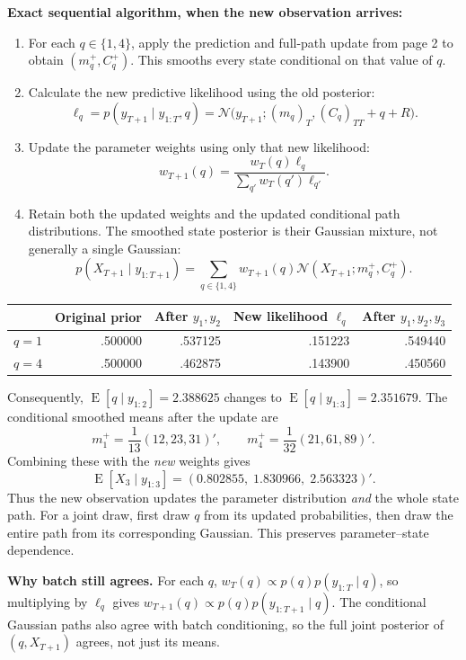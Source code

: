 \documentclass[10pt,a4paper]{article}
\newcommand{\Normal}{\mathcal N}
\newcommand{\E}{\operatorname E}
\begin{document}
\textbf{Exact sequential algorithm, when the new observation arrives:}
\begin{enumerate}
\item For each $q\in\{1,4\}$, apply the prediction and full-path update from page 2 to
obtain $(m_q^+,C_q^+)$. This smooths every state conditional on that value of $q$.
\item Calculate the new predictive likelihood using the old posterior:
\[
\ell_q=p(y_{T+1}\mid y_{1:T},q)
=\Normal\bigl(y_{T+1};(m_q)_T,(C_q)_{TT}+q+R\bigr).
\]
\item Update the parameter weights using only that new likelihood:
\[
\boxed{w_{T+1}(q)=\frac{w_T(q)\ell_q}{\sum_{q'}w_T(q')\ell_{q'}}.}
\]
\item Retain both the updated weights and the updated conditional path distributions.
The smoothed state posterior is their Gaussian mixture, not generally a single Gaussian:
\[
p(X_{T+1}\mid y_{1:T+1})
=\sum_{q\in\{1,4\}}w_{T+1}(q)\Normal(X_{T+1};m_q^+,C_q^+).
\]
\end{enumerate}

\begin{center}\small
\begin{tabular}{lrrrr}\toprule
& Original prior & After $y_1,y_2$ & New likelihood $\ell_q$ & After $y_1,y_2,y_3$\\\midrule
$q=1$ & .500000 & .537125 & .151223 & .549440\\
$q=4$ & .500000 & .462875 & .143900 & .450560\\\bottomrule
\end{tabular}
\end{center}
Consequently, $\E[q\mid y_{1:2}]=2.388625$ changes to
$\E[q\mid y_{1:3}]=2.351679$. The conditional smoothed means after the update are
\[
m_1^+=\frac1{13}(12,23,31)',\qquad
m_4^+=\frac1{32}(21,61,89)'.
\]
Combining these with the \emph{new} weights gives
\[
\E[X_3\mid y_{1:3}]=(0.802855,\;1.830966,\;2.563323)'.
\]
Thus the new observation updates the parameter distribution \emph{and} the whole state path.
For a joint draw, first draw $q$ from its updated probabilities, then draw the entire path
from its corresponding Gaussian. This preserves parameter--state dependence.

\textbf{Why batch still agrees.} For each $q$,
$w_T(q)\propto p(q)p(y_{1:T}\mid q)$, so multiplying by $\ell_q$ gives
$w_{T+1}(q)\propto p(q)p(y_{1:T+1}\mid q)$.
The conditional Gaussian paths also agree with batch conditioning, so the full joint
posterior of $(q,X_{T+1})$ agrees, not just its means.
\end{document}
